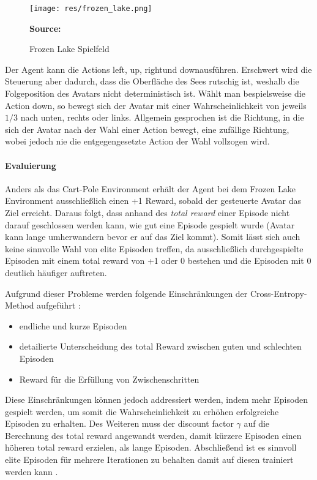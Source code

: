 \documentclass[11pt]{scrartcl}
\newcommand{\source}[1]{\vspace{-5pt} \caption*{\hfill \textbf{Source:} {#1}} }
\begin{document}
\begin{figure}[htp]
\centering
\texttt{[image: res/frozen\_lake.png]}
\caption{Frozen Lake Spielfeld}
\source{\cite[~S.90 - Chapter 4 - Figure 5]{L2018}}
\label{fig:frozen_lake}
\end{figure}

\noindent
Der Agent kann die Actions \grqq left\grqq, \grqq up\grqq, \grqq right\grqq und \grqq
down\grqq ausführen. Erschwert wird die Steuerung aber dadurch, dass die Oberfläche des
Sees rutschig ist, weshalb die Folgeposition des Avatars nicht deterministisch ist.
Wählt man bespielsweise die Action \grqq down\grqq, so bewegt sich der Avatar mit einer
Wahrscheinlichkeit von jeweils $1/3$ nach unten, rechts oder links. Allgemein gesprochen
ist die Richtung, in die sich der Avatar nach der Wahl einer Action bewegt, eine zufällige
Richtung, wobei jedoch nie die entgegengesetzte Action der Wahl vollzogen wird.


\paragraph*{Evaluierung}
\noindent
\newline
Anders als das Cart-Pole Environment erhält der Agent bei dem Frozen Lake Environment 
ausschließlich einen +1 Reward, sobald der gesteuerte Avatar das Ziel erreicht. Daraus folgt,
dass anhand des \textit{total reward} einer Episode nicht darauf geschlossen werden kann,
wie gut eine Episode gespielt wurde (Avatar kann lange umherwandern bevor er auf das Ziel kommt).
Somit lässt sich auch keine sinnvolle Wahl von elite Episoden treffen, da ausschließlich
durchgespielte Episoden mit einem total reward von +1 oder 0 bestehen und die Episoden mit 0
deutlich häufiger auftreten.

Aufgrund dieser Probleme werden folgende Einschränkungen der Cross-Entropy-Method 
aufgeführt \cite[~S.92 f.]{L2018}:
\begin{itemize}
\itemsep0pt
\item endliche und kurze Episoden
\item detailierte Unterscheidung des total Reward zwischen guten und schlechten Episoden
\item Reward für die Erfüllung von Zwischenschritten
\end{itemize}

Diese Einschränkungen können jedoch addressiert werden, indem mehr Episoden gespielt werden, 
um somit die Wahrscheinlichkeit zu erhöhen erfolgreiche Episoden zu erhalten. Des Weiteren
muss der discount factor $\gamma$ auf die Berechnung des total reward angewandt werden, damit
kürzere Episoden einen höheren total reward erzielen, als lange Episoden. Abschließend ist es
sinnvoll elite Episoden für mehrere Iterationen zu behalten damit auf diesen trainiert werden
kann \cite[~S.93]{L2018}.  
\end{document}
